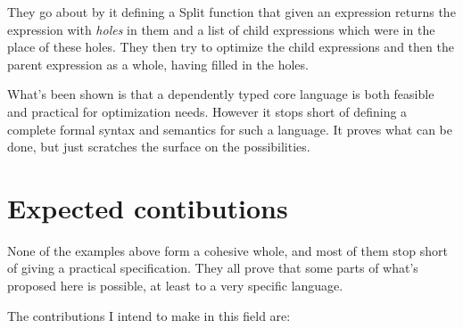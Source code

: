 \documentclass[11pt,twoside,a4paper]{article}
\begin{document}
They go about by it defining a Split function that given an expression returns the expression with \emph{holes} in them and a list of child expressions which were in the place of these holes. They then try to optimize the child expressions and then the parent expression as a whole, having filled in the holes.

What's been shown is that a dependently typed core language is both feasible and practical for optimization needs.  However it stops short of defining a complete formal syntax and semantics for such a language. It proves what can be done, but just scratches the surface on the possibilities.

\section{Expected contibutions}
None of the examples above form a cohesive whole, and most of them stop short of giving a practical specification. They all prove that some parts of what's proposed here is possible, at least to a very specific language.

The contributions I intend to make in this field are:
\end{document}
